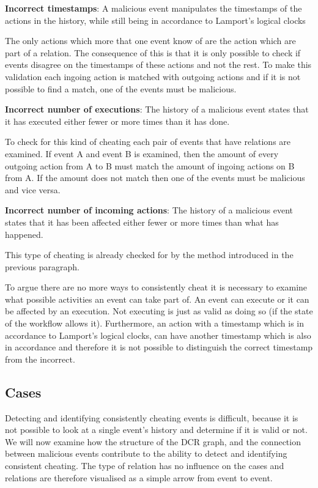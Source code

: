 	\newpar \textbf{Incorrect timestamps}: A malicious event manipulates the timestamps of the actions in the history, while still being in accordance to Lamport's logical clocks
	
	The only actions which more that one event know of are the action which are part of a relation. The consequence of this is that it is only possible to check if events disagree on the timestamps of these actions and not the rest. To make this validation each ingoing action is matched with outgoing actions and if it is not possible to find a match, one of the events must be malicious. 
	
	\newpar \textbf{Incorrect number of executions}: The history of a malicious event states that it has executed either fewer or more times than it has done.
	
	To check for this kind of cheating each pair of events that have relations are examined. If event A and event B is examined, then the amount of every outgoing action from A to B must match the amount of ingoing actions on B from A. If the amount does not match then one of the events must be malicious and vice versa.
	
	\newpar \textbf{Incorrect number of incoming actions}: The history of a malicious event states that it has been affected either fewer or more times than what has happened.
	
	This type of cheating is already checked for by the method introduced in the previous paragraph.
	
	\newpar To argue there are no more ways to consistently cheat it is necessary to examine what possible activities an event can take part of. An event can execute or it can be affected by an execution. Not executing is just as valid as doing so (if the state of the workflow allows it). Furthermore, an action with a timestamp which is in accordance to Lamport's logical clocks, can have another timestamp which is also in accordance and therefore it is not possible to distinguish the correct timestamp from the incorrect. 
	
	\subsection{Cases}
	Detecting and identifying consistently cheating events is difficult, because it is not possible to look at a single event's history and determine if it is valid or not. We will now examine how the structure of the DCR graph, and the connection between malicious events contribute to the ability to detect and identifying consistent cheating. The type of relation has no influence on the cases and relations are therefore visualised as a simple arrow from event to event.
	
